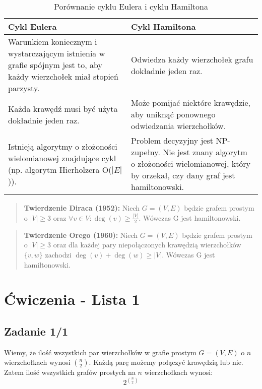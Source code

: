 \documentclass{article}
\begin{document}
\begin{table}[h!]
\centering
\caption{Porównanie cyklu Eulera i cyklu Hamiltona}
\begin{tabular}{|p{}|p{}|}
\hline
\textbf{Cykl Eulera} & \textbf{Cykl Hamiltona} \\
\hline
Warunkiem koniecznym i wystarczającym istnienia w grafie spójnym jest to, aby każdy wierzchołek miał stopień parzysty. & Odwiedza każdy wierzchołek grafu dokładnie jeden raz. \\[4mm]
Każda krawędź musi być użyta dokładnie jeden raz. & Może pomijać niektóre krawędzie, aby uniknąć ponownego odwiedzania wierzchołków. \\[4mm]
Istnieją algorytmy o złożoności wielomianowej znajdujące cykl (np. algorytm Hierholzera O($|E|$)). & Problem decyzyjny jest NP-zupełny. Nie jest znany algorytm o złożoności wielomianowej, który by orzekał, czy dany graf jest hamiltonowski. \\
\hline
\end{tabular}
\end{table}
\begin{quote}
\textbf{Twierdzenie Diraca (1952):} Niech $G = (V, E)$ będzie grafem prostym o $|V| \geq 3$ oraz $\forall v \in V: \deg(v) \geq \frac{|V|}{2}$. Wówczas G jest hamiltonowski.
\end{quote}

\begin{quote}
\textbf{Twierdzenie Orego (1960):} Niech $G = (V, E)$ będzie grafem prostym o $|V| \geq 3$ oraz dla każdej pary niepołączonych krawędzią wierzchołków $\{v, w\}$ zachodzi $\deg(v) + \deg(w) \geq |V|$. Wówczas G jest hamiltonowski.
\end{quote}
\newpage
\section*{Ćwiczenia - Lista 1}

\subsection*{Zadanie 1/1}

Wiemy, że ilość wszystkich par wierzchołków w grafie prostym $G = (V, E)$ o $n$ wierzchołkach wynosi $\binom{n}{2}$.
Każdą parę możemy połączyć krawędzią lub nie.
Zatem ilość wszystkich grafów prostych na $n$ wierzchołkach wynosi:
\[
2^{\binom{n}{2}}
\]
\end{document}
